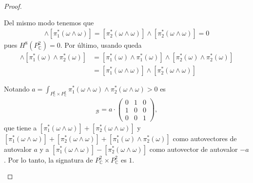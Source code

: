 \documentclass[11pt]{article}
\newcommand{\C}{\mathbb{C}}
\begin{document}
\begin{proof}
\begin{itemize}[listparindent = \parindent]
\begin{itemize}[listparindent = \parindent]
Del mismo modo tenemos que 
\begin{align*}
[\pi_1^*(\omega \wedge \omega)] \wedge [\pi_1^*(\omega \wedge \omega)] = [\pi_2^*(\omega \wedge \omega)] \wedge [\pi_2^*(\omega \wedge \omega)] = 0
\end{align*}
pues $H^8(P_\C^2) = 0$. Por último, usando queda
\begin{align*}
 [\pi_1^*(\omega) \wedge \pi_2^*(\omega)] \wedge  [\pi_1^*(\omega) \wedge \pi_2^*(\omega)] &=  [\pi_1^*(\omega) \wedge \pi_1^*(\omega)] \wedge  [\pi_2^*(\omega) \wedge \pi_2^*(\omega)]\\
 &= [\pi_1^*(\omega \wedge \omega)] \wedge  [\pi_2^*(\omega \wedge \omega)]
\end{align*}

Notando $a = \int_{P_\C^2 \times P_\C^2} \pi_1^*(\omega \wedge \omega) \wedge  \pi_2^*(\omega \wedge \omega) > 0$ es
\begin{align*}
[\beta]_{\mathscr{B}} = a \cdot \begin{pmatrix}
0 & 1 & 0\\
1 & 0 & 0\\
0 & 0 & 1
\end{pmatrix},
\end{align*}
que tiene a $ [\pi_1^*(\omega \wedge \omega)] + [\pi_2^*(\omega \wedge \omega)]$ y $ [\pi_1^*(\omega \wedge \omega)] + [\pi_2^*(\omega \wedge \omega)] + [\pi_1^*(\omega) \wedge \pi_2^*(\omega)]$ como autovectores de autovalor $a$ y a $ [\pi_1^*(\omega \wedge \omega)] - [\pi_2^*(\omega \wedge \omega)]$ como autovector de autovalor $-a$. Por lo tanto, la signatura de $P_\C^2 \times P_\C^2$ es $1$.
\end{itemize}
\end{itemize}
\end{proof}
\end{document}
